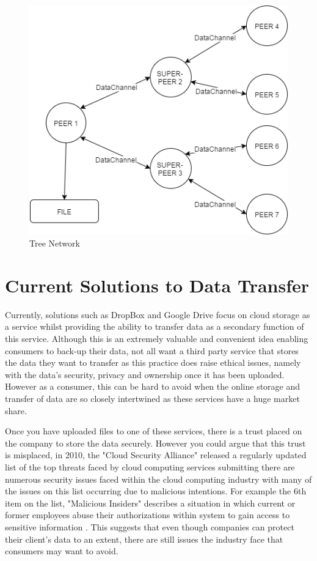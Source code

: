 \documentclass[]{report}
\begin{document}
	\begin{figure}[H]
		\centering
		\caption{Tree Network}
		\includegraphics[scale=0.4]{treetopology.png}
	\end{figure}			
\section{Current Solutions to Data Transfer}
	Currently, solutions such as DropBox and Google Drive focus on cloud storage as a service whilst providing the ability to transfer data as a secondary function of this service. Although this is an extremely valuable and convenient idea enabling consumers to back-up their data, not all want a third party service that stores the data they want to transfer as this practice does raise ethical issues, namely with the data's security, privacy and ownership once it has been uploaded. However as a consumer, this can be hard to avoid when the online storage and transfer of data are so closely intertwined as these services have a huge market share.
	
	Once you have uploaded files to one of these services, there is a trust placed on the company to store the data securely. However you could argue that this trust is misplaced, in 2010, the "Cloud Security Alliance" released a regularly updated list of the top threats faced by cloud computing services submitting there are numerous security issues faced within the cloud computing industry with many of the issues on this list occurring due to malicious intentions. For example the 6th item on the list, "Malicious Insiders" describes a situation in which current or former employees abuse their authorizations within system to gain access to sensitive information \cite{CSA Top Threats}. This suggests that even though companies can protect their client's data to an extent, there are still issues the industry face that consumers may want to avoid.
\end{document}
